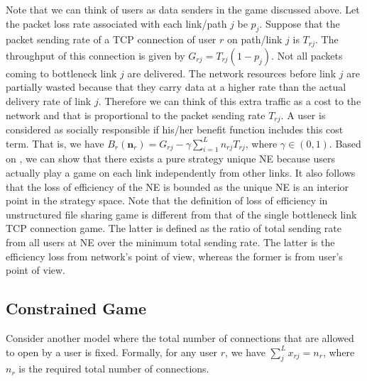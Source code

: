 \documentclass[conference]{IEEEtran}
\begin{document}

Note that we can think of users as data senders in the game
discussed above.
Let the packet loss rate associated with each link/path $j$ be
$p_j$. Suppose that the packet sending rate of a TCP connection of
user $r$ on path/link $j$ is $T_{rj}$. The throughput of this
connection is given by $G_{rj}=T_{rj}(1-p_j)$. Not all packets
coming to bottleneck link $j$ are delivered. The network resources
before link $j$ are partially wasted because that they carry data
at a higher rate than the actual delivery rate of link $j$.
Therefore we can think of this extra traffic as a cost to the
network and that is proportional to the packet sending rate
$T_{rj}$. A user is considered as socially responsible if his/her
benefit function includes this cost term. That is, we have
$B_r(\mathbf{n}_r)= G_{rj}-\gamma \sum_{i=1}^L n_{rj} T_{rj}$,
where $\gamma\in (0,1)$. Based on
\cite{zhang05tcpgame_icnp}, we can show that there exists a pure
strategy unique NE because users actually play a game on each link
independently from other links. It also follows that the loss of
efficiency of the NE is bounded as the unique NE is an interior
point in the strategy space.
Note that the definition of loss of efficiency in unstructured
file sharing game is different from that of the single bottleneck
link TCP connection game. The latter is defined as the ratio of
total sending rate from all users at NE over the minimum total
sending rate. The latter is the efficiency loss from network's
point of view, whereas the former is from user's point of view.


\subsection{Constrained Game}

Consider another model where the total number of connections that
are allowed to open by a user is fixed. Formally, for any user
$r$, we have $\sum_{j}^L x_{rj}= n_r$, where $n_r$ is the required
total number of connections.

\end{document}
